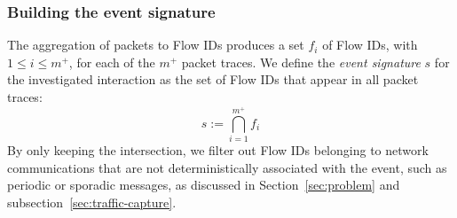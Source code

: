 \subsubsection{Building the event signature}

The aggregation of packets to Flow IDs produces a set $f_i$ of Flow IDs, with $1\leq i \leq m^+$, for each of the $m^+$ packet traces.
We define the \emph{event signature} $s$ for the investigated interaction as the set of Flow IDs that appear in all packet traces:
\[
    s := \bigcap_{i=1}^{m^+} f_i
\]
By only keeping the intersection, we filter out Flow IDs belonging to network communications that are not deterministically associated with the event, such as periodic or sporadic messages, as discussed in Section~\ref{sec:problem} and subsection~\ref{sec:traffic-capture}.






